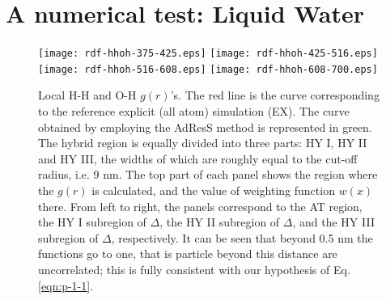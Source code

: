 \documentclass[aip,jcp,a4paper,reprint,onecolumn]{revtex4-1}
\begin{document}
\section{A numerical test: Liquid Water}
\begin{figure}
  \centering
  \texttt{[image: rdf-hhoh-375-425.eps]}
  \texttt{[image: rdf-hhoh-425-516.eps]}
  \texttt{[image: rdf-hhoh-516-608.eps]}
  \texttt{[image: rdf-hhoh-608-700.eps]}
  \caption{Local H-H and O-H $g(r)$'s.
    The red line is the curve corresponding to the reference explicit (all atom)
    simulation (EX).
    The curve obtained by employing the AdResS 
    method is represented in green.
    The hybrid region is equally
    divided into three parts: HY I, HY II and HY III, the widths of
    which are roughly equal to the cut-off radius, i.e. 9 \textsf{nm}.    
    The top part of each panel shows the region where the $g(r)$ is calculated,
    and the value of weighting function $w(x)$ there.
    From left to right, the panels correspond to the AT region, 
    the HY I subregion of $\Delta$,
    the HY II subregion of $\Delta$,
    and the HY III subregion of $\Delta$, respectively. It can be seen that beyond 0.5 \textsf{nm} the functions go to one, that is particle beyond this distance are uncorrelated; this is fully consistent with our hypothesis of Eq.\ref{eqn:p-1-1}.}
  \label{fig:tmp2a}
\end{figure}
\end{document}

